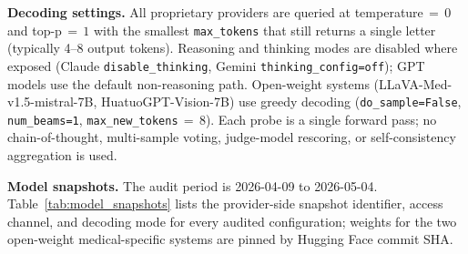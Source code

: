 \documentclass{article}
\begin{document}
\textbf{Decoding settings.} All proprietary providers are queried at temperature\,$=\,0$ and top-p\,$=\,1$ with the smallest \texttt{max\_tokens} that still returns a single letter (typically 4--8 output tokens). Reasoning and thinking modes are disabled where exposed (Claude \texttt{disable\_thinking}, Gemini \texttt{thinking\_config=off}); GPT models use the default non-reasoning path. Open-weight systems (LLaVA-Med-v1.5-mistral-7B, HuatuoGPT-Vision-7B) use greedy decoding (\texttt{do\_sample=False}, \texttt{num\_beams=1}, \texttt{max\_new\_tokens}\,$=\,8$). Each probe is a single forward pass; no chain-of-thought, multi-sample voting, judge-model rescoring, or self-consistency aggregation is used.

\textbf{Model snapshots.} The audit period is 2026-04-09 to 2026-05-04. Table~\ref{tab:model_snapshots} lists the provider-side snapshot identifier, access channel, and decoding mode for every audited configuration; weights for the two open-weight medical-specific systems are pinned by Hugging Face commit SHA.
\end{document}
